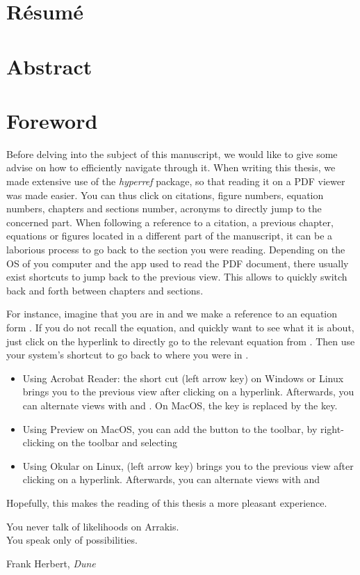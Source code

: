 \chapter*{Résumé}
\newpage

\chapter*{Abstract}
\newpage

\chapter*{Foreword}
Before delving into the subject of this manuscript, we would like to give some advise on how to efficiently navigate through it. When writing this thesis, we made extensive use of the \textit{hyperref} package, so that reading it on a PDF viewer was made easier. You can thus click on citations, figure numbers, equation numbers, chapters and sections number, acronyms \etc to directly jump to the concerned part. When following a reference to a citation, a previous chapter, equations or figures located in a different part of the manuscript, it can be a laborious process to go back to the section you were reading. Depending on the OS of you computer and the app used to read the PDF document, there usually exist shortcuts to jump back to the previous view. This allows to quickly switch back and forth between chapters and sections.

For instance, imagine that you are in  and we make a reference to an equation form . If you do not recall the equation, and quickly want to see what it is about, just click on the hyperlink to directly go to the relevant equation from . Then use your system's shortcut to go back to where you were in . 
\begin{itemize}
    \item Using Acrobat Reader: the short cut \keys{\Altwin + \arrowkeyleft} (left arrow key) on Windows or Linux brings you to the previous view after clicking on a hyperlink. Afterwards, you can alternate views with \keys{\Altwin + \arrowkeyright} and \keys{\Altwin + \arrowkeyleft}. On MacOS, the \keys{\Altwin} key is replaced by the \keys{\cmd} key.
    \item Using Preview on MacOS, you can add the  button to the toolbar, by right-clicking on the toolbar and selecting 
    \item Using Okular on Linux, \keys{\Altwin + \shift + \arrowkeyleft} (left arrow key) brings you to the previous view after clicking on a hyperlink. Afterwards, you can alternate views with \keys{\Altwin + \shift + \arrowkeyright} and \keys{\Altwin + \shift + \arrowkeyleft}
\end{itemize}
Hopefully, this makes the reading of this thesis a more pleasant experience.

\newpage
\renewcommand{\epigraphsize}{\normalsize}
\setlength{\epigraphrule}{1pt}
\setlength{\epigraphwidth}{0.48\linewidth}
\vspace*{\fill}
\epigraph{You never talk of likelihoods on Arrakis.\\You speak only of possibilities.}{Frank Herbert, \textit{Dune}}
\vspace*{\fill}

\newpage